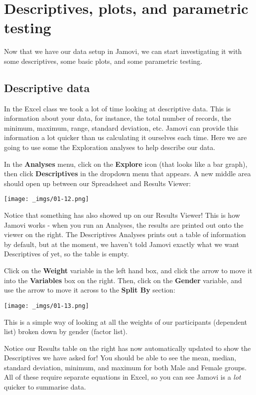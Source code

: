 \documentclass[
  letterpaper,
  DIV=11,
  numbers=noendperiod]{scrartcl}
\begin{document}
\newpage{}

\hypertarget{descriptives-plots-and-parametric-testing}{%
\section{Descriptives, plots, and parametric
testing}\label{descriptives-plots-and-parametric-testing}}

Now that we have our data setup in Jamovi, we can start investigating it
with some descriptives, some basic plots, and some parametric testing.

\hypertarget{descriptive-data}{%
\subsection{Descriptive data}\label{descriptive-data}}

In the Excel class we took a lot of time looking at descriptive data.
This is information about your data, for instance, the total number of
records, the minimum, maximum, range, standard deviation, etc. Jamovi
can provide this information a lot quicker than us calculating it
ourselves each time. Here we are going to use some the Exploration
analyses to help describe our data.

In the \textbf{Analyses} menu, click on the \textbf{Explore} icon (that
looks like a bar graph), then click \textbf{Descriptives} in the
dropdown menu that appears. A new middle area should open up between our
Spreadsheet and Results Viewer:

\texttt{[image: \_imgs/01-12.png]}

Notice that something has also showed up on our Results Viewer! This is
how Jamovi works - when you run an Analyses, the results are printed out
onto the viewer on the right. The Descriptives Analyses prints out a
table of information by default, but at the moment, we haven't told
Jamovi exactly what we want Descriptives of yet, so the table is empty.

Click on the \textbf{Weight} variable in the left hand box, and click
the arrow to move it into the \textbf{Variables} box on the right. Then,
click on the \textbf{Gender} variable, and use the arrow to move it
across to the \textbf{Split By} section:

\texttt{[image: \_imgs/01-13.png]}

This is a simple way of looking at all the weights of our participants
(dependent list) broken down by gender (factor list).

Notice our Results table on the right has now automatically updated to
show the Descriptives we have asked for! You should be able to see the
mean, median, standard deviation, minimum, and maximum for both Male and
Female groups. All of these require separate equations in Excel, so you
can see Jamovi is a \emph{lot} quicker to summarise data.
\end{document}
